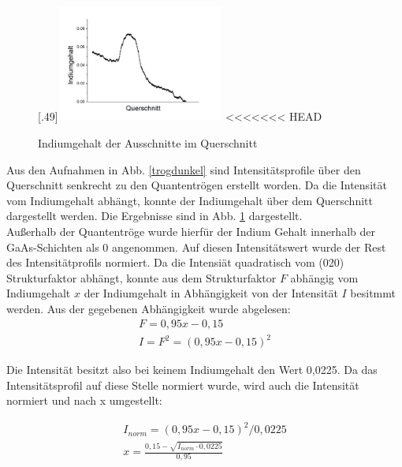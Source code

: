 \documentclass[a4paper,11pt,DIV=11]{scrartcl}
\begin{document}
\begin{figure}[htb]
	[.49\linewidth]{\includegraphics[width=0.49\textwidth]{Versuchsdaten/11/380000xausschnitt.png}}
<<<<<<< HEAD
	\caption{Indiumgehalt der Ausschnitte im Querschnitt} \label{indprofil}
\end{figure}

Aus den Aufnahmen in Abb. \ref{trogdunkel} sind Intensitätsprofile über den Querschnitt senkrecht zu den Quantentrögen erstellt worden. Da die Intensität vom Indiumgehalt abhängt, konnte der Indiumgehalt über dem Querschnitt dargestellt werden. Die Ergebnisse sind in Abb. \ref{indprofil} dargestellt. \\
Außerhalb der Quantentröge wurde hierfür der Indium Gehalt innerhalb der GaAs-Schichten als 0 angenommen. Auf diesen Intensitätswert wurde der Rest des Intensitätprofils normiert. Da die Intensiät quadratisch vom (020) Strukturfaktor abhängt, konnte aus dem Strukturfaktor $F$ abhängig vom Indiumgehalt $x$ der Indiumgehalt in Abhängigkeit von der Intensität $I$ besitmmt werden. Aus der gegebenen Abhängigkeit wurde abgelesen:
\begin{align*}
	F = 0,95x - 0,15 \\
	I = F^2 = (0,95x - 0,15)^2 
\end{align*}

Die Intensität besitzt also bei keinem Indiumgehalt den Wert 0,0225. Da das Intensitätsprofil auf diese Stelle normiert wurde, wird auch die Intensität normiert und nach x umgestellt:

\begin{align*}
	I_{norm} = (0,95x - 0,15)^2 / 0,0225 \\
	x = \frac{0,15-\sqrt{I_{norm}\cdot 0,0225}}{0,95}
\end{align*}
\end{document}
